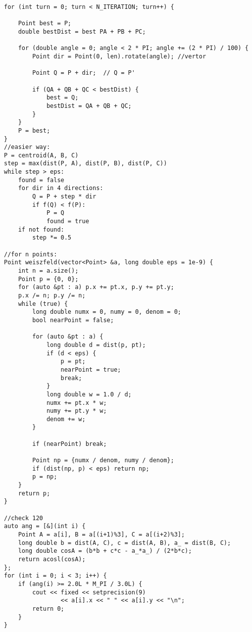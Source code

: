 \documentclass[11pt,a4paper]{article}
\begin{document}
\begin{multicols*}{2}
\begin{lstlisting}
for (int turn = 0; turn < N_ITERATION; turn++) {  

	Point best = P;  
	double bestDist = best PA + PB + PC;

	for (double angle = 0; angle < 2 * PI; angle += (2 * PI) / 100) {
		Point dir = Point(0, len).rotate(angle); //vertor 
		
		Point Q = P + dir;  // Q = P'
		
		if (QA + QB + QC < bestDist) {
            best = Q;
            bestDist = QA + QB + QC;
        }
    }
	P = best;
}
//easier way:
P = centroid(A, B, C)
step = max(dist(P, A), dist(P, B), dist(P, C))
while step > eps:
    found = false
    for dir in 4 directions:
        Q = P + step * dir
        if f(Q) < f(P):
            P = Q
            found = true
    if not found:
        step *= 0.5

//for n points:
Point weiszfeld(vector<Point> &a, long double eps = 1e-9) {
    int n = a.size();
    Point p = {0, 0};
    for (auto &pt : a) p.x += pt.x, p.y += pt.y;
    p.x /= n; p.y /= n;
    while (true) {
        long double numx = 0, numy = 0, denom = 0;
        bool nearPoint = false;

        for (auto &pt : a) {
            long double d = dist(p, pt);
            if (d < eps) { 
                p = pt;
                nearPoint = true;
                break;
            }
            long double w = 1.0 / d;
            numx += pt.x * w;
            numy += pt.y * w;
            denom += w;
        }

        if (nearPoint) break;

        Point np = {numx / denom, numy / denom};
        if (dist(np, p) < eps) return np;
        p = np;
    }
    return p;
}

//check 120
auto ang = [&](int i) {
    Point A = a[i], B = a[(i+1)%3], C = a[(i+2)%3];
    long double b = dist(A, C), c = dist(A, B), a_ = dist(B, C);
    long double cosA = (b*b + c*c - a_*a_) / (2*b*c);
    return acosl(cosA);
};
for (int i = 0; i < 3; i++) {
    if (ang(i) >= 2.0L * M_PI / 3.0L) {
        cout << fixed << setprecision(9)
                << a[i].x << " " << a[i].y << "\n";
        return 0;
    }
}



\end{lstlisting}

\end{multicols*}
\end{document}
